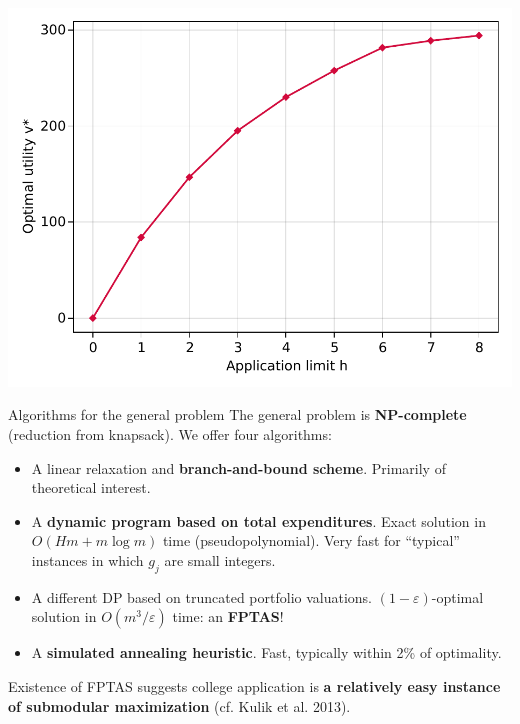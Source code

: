 \documentclass[11pt,slidestop,compress,mathserif,notheorems]{beamer}
\theoremstyle{definition}
\theoremstyle{definition}
\begin{document}
\begin{frame}[plain]
\begin{center}
 \includegraphics[height=\textheight]{./plots/h_v-example.pdf}
\end{center}
\end{frame}







\begin{frame}{Algorithms for the general problem}
The general problem is \textbf{NP-complete} (reduction from knapsack). We offer four algorithms:
\begin{itemize}
\item A linear relaxation and \textbf{branch-and-bound scheme}. Primarily of theoretical interest.

\item A \textbf{dynamic program based on total expenditures}. Exact solution in $O(Hm + m\log m)$ time (pseudopolynomial). Very fast for ``typical'' instances in which $g_j$ are small integers.

\item A different DP based on truncated portfolio valuations. $(1 - \varepsilon)$-optimal solution in $O(m^3 / \varepsilon)$ time: an \textbf{FPTAS}!
\item A \textbf{simulated annealing heuristic}. Fast, typically within 2\% of optimality.
\end{itemize}

Existence of FPTAS suggests college application is \textbf{a relatively easy instance of submodular maximization} (cf. Kulik et al. 2013).
\end{frame}
\end{document}
